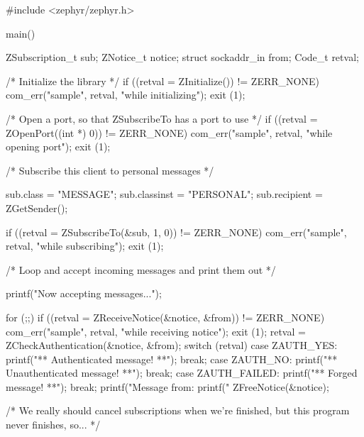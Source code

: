 \begin{code}
#include <zephyr/zephyr.h>

main()
{
    ZSubscription_t sub;
    ZNotice_t notice;
    struct sockaddr_in from;
    Code_t retval;

    /* Initialize the library */
    if ((retval = ZInitialize()) != ZERR_NONE) {
        com_err("sample", retval, "while initializing");
        exit (1);
    }

    /* Open a port, so that ZSubscribeTo has a port to use */
    if ((retval = ZOpenPort((int *) 0)) != ZERR_NONE) {
        com_err("sample", retval, "while opening port");
        exit (1);
    }

    /* Subscribe this client to personal messages */

    sub.class = "MESSAGE";
    sub.classinst = "PERSONAL";
    sub.recipient = ZGetSender();

    if ((retval = ZSubscribeTo(&sub, 1, 0)) != ZERR_NONE) {
        com_err("sample", retval, "while subscribing");
        exit (1);
    }

    /* Loop and accept incoming messages and print them out */

    printf("Now accepting messages...\n");

    for (;;) {
        if ((retval = ZReceiveNotice(&notice, &from)) != ZERR_NONE) {
                com_err("sample", retval, "while receiving notice");
                exit (1);
        }
        retval = ZCheckAuthentication(&notice, &from);
        switch (retval) {
        case ZAUTH_YES:
            printf("** Authenticated message! **\n");
            break;
        case ZAUTH_NO:
            printf("** Unauthenticated message! **\n");
            break;
        case ZAUTH_FAILED:
            printf("** Forged message! **\n");
            break;
        }
        printf("Message from: %
        printf("%
        ZFreeNotice(&notice);
    }

    /* We really should cancel subscriptions when we're finished,
       but this program never finishes, so... */
}
\end{code}
